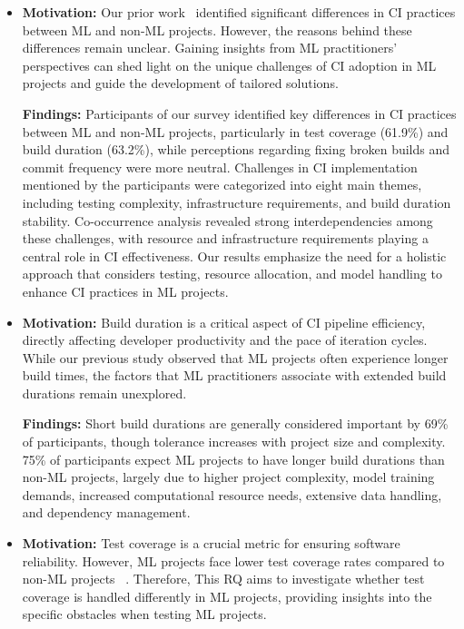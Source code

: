 \begin{itemize}
    \item \textit{\textbf{\RQone}}
    \newline
    \textbf{Motivation:} 
    Our prior work~\citep{bernardo2024machine} identified significant differences in CI practices between ML and non-ML projects. However, the reasons behind these differences remain unclear. Gaining insights from ML practitioners' perspectives can shed light on the unique challenges of CI adoption in ML projects and guide the development of tailored solutions.
    
    \textbf{Findings:} 
    Participants of our survey identified key differences in CI practices between ML and non-ML projects, particularly in test coverage (61.9\%) and build duration (63.2\%), while perceptions regarding fixing broken builds and commit frequency were more neutral. Challenges in CI implementation mentioned by the participants were categorized into eight main themes, including testing complexity, infrastructure requirements, and build duration stability. Co-occurrence analysis revealed strong interdependencies among these challenges, with resource and infrastructure requirements playing a central role in CI effectiveness. Our results emphasize the need for a holistic approach that considers testing, resource allocation, and model handling to enhance CI practices in ML projects.
    
    \item \textit{\textbf{\RQtwo}}
    \newline
    \textbf{Motivation:} 
    Build duration is a critical aspect of CI pipeline efficiency, directly affecting developer productivity and the pace of iteration cycles. While our previous study observed that ML projects often experience longer build times, the factors that ML practitioners associate with extended build durations remain unexplored.

    \textbf{Findings:}     
    Short build durations are generally considered important by 69\% of participants, though tolerance increases with project size and complexity. 75\% of participants expect ML projects to have longer build durations than non-ML projects, largely due to higher project complexity, model training demands, increased computational resource needs, extensive data handling, and dependency management.     
    
    \item \textit{\textbf{\RQthree}}
    \newline
    \textbf{Motivation:} 
    Test coverage is a crucial metric for ensuring software reliability. However, ML projects face lower test coverage rates compared to non-ML projects ~\citep{bernardo2024machine}. Therefore, This RQ aims to investigate whether test coverage is handled differently in ML projects, providing insights into the specific obstacles when testing ML projects.


\end{itemize}
